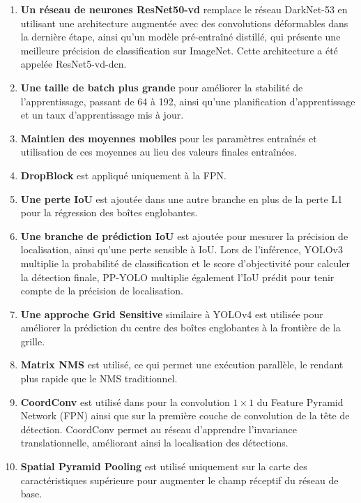 \documentclass{article}
\begin{document}
\begin{enumerate}
    \item \textbf{Un réseau de neurones ResNet50-vd} remplace le réseau DarkNet-53 en utilisant une architecture augmentée avec des convolutions déformables \cite{102} dans la dernière étape, ainsi qu'un modèle pré-entraîné distillé, qui présente une meilleure précision de classification sur ImageNet. Cette architecture a été appelée ResNet5-vd-dcn.
    \item \textbf{Une taille de batch plus grande} pour améliorer la stabilité de l'apprentissage, passant de 64 à 192, ainsi qu'une planification d'apprentissage et un taux d'apprentissage mis à jour.
    \item \textbf{Maintien des moyennes mobiles} pour les paramètres entraînés et utilisation de ces moyennes au lieu des valeurs finales entraînées.
    \item \textbf{DropBlock} est appliqué uniquement à la FPN.
    \item \textbf{Une perte IoU} est ajoutée dans une autre branche en plus de la perte L1 pour la régression des boîtes englobantes.
    \item \textbf{Une branche de prédiction IoU} est ajoutée pour mesurer la précision de localisation, ainsi qu'une perte sensible à IoU. Lors de l'inférence, YOLOv3 multiplie la probabilité de classification et le score d'objectivité pour calculer la détection finale, PP-YOLO multiplie également l'IoU prédit pour tenir compte de la précision de localisation.
    \item \textbf{Une approche Grid Sensitive} similaire à YOLOv4 est utilisée pour améliorer la prédiction du centre des boîtes englobantes à la frontière de la grille.
    \item \textbf{Matrix NMS} \cite{103} est utilisé, ce qui permet une exécution parallèle, le rendant plus rapide que le NMS traditionnel.
    \item \textbf{CoordConv} \cite{104} est utilisé dans pour la convolution $1\times 1$ du Feature Pyramid Network (FPN) ainsi que sur la première couche de convolution de la tête de détection. CoordConv permet au réseau d'apprendre l'invariance translationnelle, améliorant ainsi la localisation des détections.
    \item \textbf{Spatial Pyramid Pooling} est utilisé uniquement sur la carte des caractéristiques supérieure pour augmenter le champ réceptif du réseau de base.
\end{enumerate}
\end{document}
